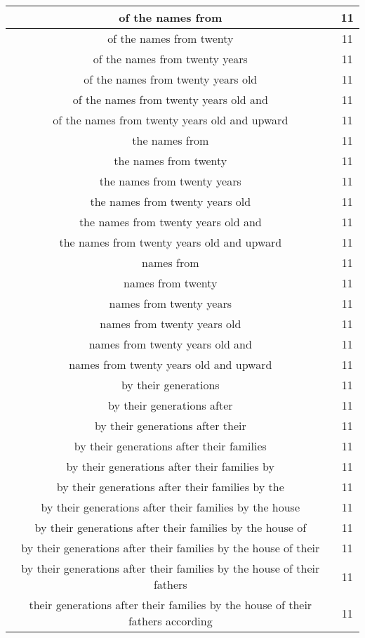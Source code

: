 \begin{center}
\begin{longtable}{|c|c|}
of the names from & 11\\ \hline 
of the names from twenty & 11\\ \hline 
of the names from twenty years & 11\\ \hline 
of the names from twenty years old & 11\\ \hline 
of the names from twenty years old and & 11\\ \hline 
of the names from twenty years old and upward & 11\\ \hline 
the names from & 11\\ \hline 
the names from twenty & 11\\ \hline 
the names from twenty years & 11\\ \hline 
the names from twenty years old & 11\\ \hline 
the names from twenty years old and & 11\\ \hline 
the names from twenty years old and upward & 11\\ \hline 
names from & 11\\ \hline 
names from twenty & 11\\ \hline 
names from twenty years & 11\\ \hline 
names from twenty years old & 11\\ \hline 
names from twenty years old and & 11\\ \hline 
names from twenty years old and upward & 11\\ \hline 
by their generations & 11\\ \hline 
by their generations after & 11\\ \hline 
by their generations after their & 11\\ \hline 
by their generations after their families & 11\\ \hline 
by their generations after their families by & 11\\ \hline 
by their generations after their families by the & 11\\ \hline 
by their generations after their families by the house & 11\\ \hline 
by their generations after their families by the house of & 11\\ \hline 
by their generations after their families by the house of their & 11\\ \hline 
by their generations after their families by the house of their fathers & 11\\ \hline 
their generations after their families by the house of their fathers according & 11\\ \hline 

\end{longtable}
\end{center}
